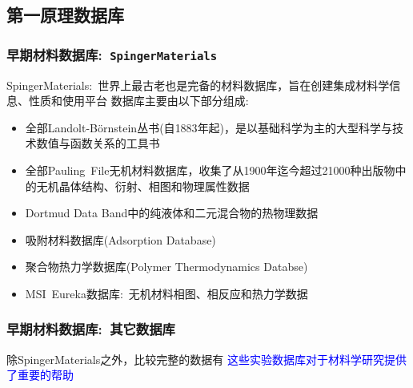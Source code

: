 {{\subsection{第一原理数据库}
\frame
{
	\frametitle{早期材料数据库:~\tt{SpingerMaterials}}
\textrm{SpingerMaterials}:~世界上最古老也是完备的材料数据库，旨在创建集成材料学信息、性质和使用平台
\vskip 3pt
数据库主要由以下部分组成:
\begin{itemize}
	\item 全部\textrm{Landolt-B{\"o}rnstein}丛书(自\textrm{1883}年起)，是以基础科学为主的大型科学与技术数值与函数关系的工具书
	\item 全部\textrm{Pauling~File}无机材料数据库，收集了从\textrm{1900}年迄今超过\textrm{21000}种出版物中的无机晶体结构、衍射、相图和物理属性数据
	\item \textrm{Dortmud Data Band}中的纯液体和二元混合物的热物理数据
	\item 吸附材料数据库\textrm{(Adsorption Database)}
	\item 聚合物热力学数据库\textrm{(Polymer Thermodynamics Databse)}
	\item \textrm{MSI~Eureka}数据库:~无机材料相图、相反应和热力学数据
\end{itemize}
}

\frame
{
	\frametitle{早期材料数据库:~其它数据库}
除\textrm{SpingerMaterials}之外，比较完整的数据有
{\fontsize{9.0pt}{4.2pt}}
\textcolor{blue}{这些实验数据库对于材料学研究提供了重要的帮助}

}}}
